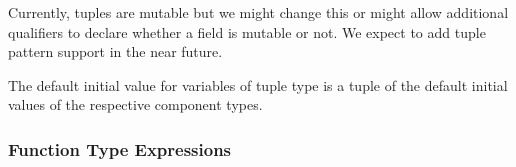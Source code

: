 \documentclass[titlepage,10pt]{article}
\begin{document}
Currently, tuples are mutable but we might change this or might allow
additional qualifiers to declare whether a field is mutable or not.  We
expect to add tuple pattern support in the near future.

The default initial value for variables of tuple type is a tuple of the
default initial values of the respective component types.

\subsubsection{Function Type Expressions}

\end{document}
